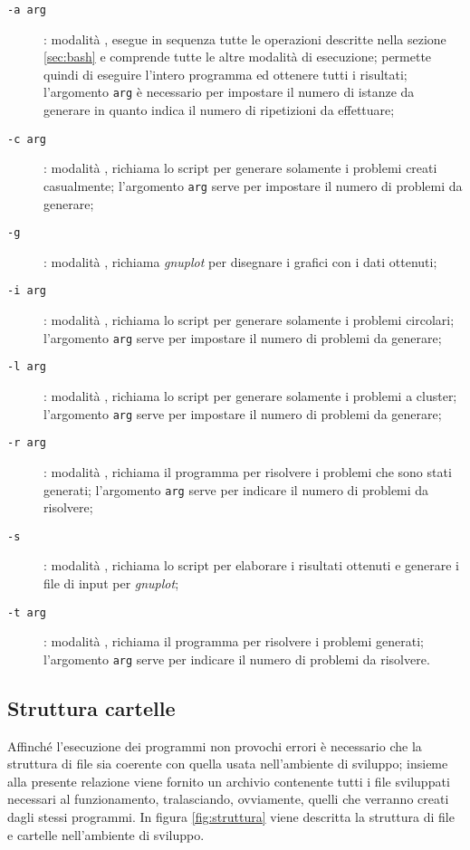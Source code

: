\begin{description}
	\item[\texttt{-a arg}]: modalità , esegue in sequenza tutte le operazioni descritte nella sezione \ref{sec:bash} e comprende tutte le altre modalità di esecuzione; permette quindi di eseguire l'intero programma ed ottenere tutti i risultati; l'argomento \texttt{arg} è necessario per impostare il numero di istanze da generare in quanto indica il numero di ripetizioni da effettuare;
	\item[\texttt{-c arg}]: modalità , richiama lo script  per generare solamente i problemi creati casualmente; l'argomento \texttt{arg} serve per impostare il numero di problemi da generare;
	\item[\texttt{-g}]: modalità , richiama \emph{gnuplot} per disegnare i grafici con i dati ottenuti;
	\item[\texttt{-i arg}]: modalità , richiama lo script  per generare  solamente i problemi circolari; l'argomento \texttt{arg} serve per impostare il numero di problemi da generare;
	\item[\texttt{-l arg}]: modalità , richiama lo script  per generare  solamente i problemi a cluster; l'argomento \texttt{arg} serve per impostare il numero di problemi da generare;
	\item[\texttt{-r arg}]: modalità , richiama il programma  per risolvere i problemi che sono stati generati; l'argomento \texttt{arg} serve per indicare il numero di problemi da risolvere;
	\item[\texttt{-s}]: modalità , richiama lo script  per elaborare i risultati ottenuti e generare i file di input per \emph{gnuplot};
	\item[\texttt{-t arg}]: modalità , richiama il programma  per risolvere i problemi generati; l'argomento \texttt{arg} serve per indicare il numero di problemi da risolvere.
\end{description}

\subsection{Struttura cartelle}
Affinché l'esecuzione dei programmi non provochi errori è necessario che la struttura di file sia coerente con quella usata nell'ambiente di sviluppo; insieme alla presente relazione viene fornito un archivio contenente tutti i file sviluppati necessari al funzionamento, tralasciando, ovviamente, quelli che verranno creati dagli stessi programmi.
In figura \ref{fig:struttura} viene descritta la struttura di file e cartelle nell'ambiente di sviluppo.

